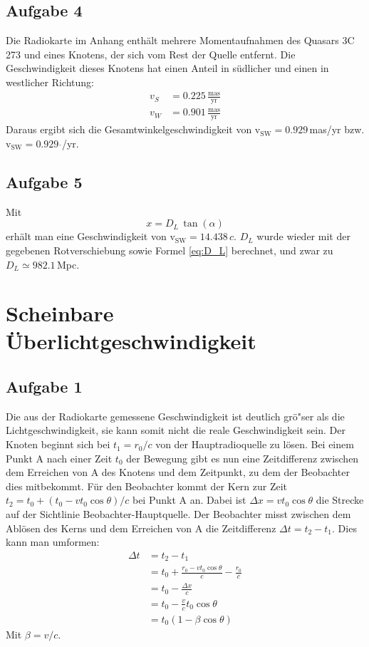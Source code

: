 \documentclass[12pt]{article}
\begin{document}
\subsection{Aufgabe 4}

Die Radiokarte im Anhang enth\"{a}lt mehrere Momentaufnahmen des Quasars 3C 273 und eines Knotens, der sich vom Rest der Quelle entfernt. Die Geschwindigkeit dieses Knotens hat einen Anteil in s\"{u}dlicher und einen in westlicher Richtung:
\begin{align*}
	v_S&=0.225\,\frac{\text{mas}}{\text{yr}}\\
	v_W&=0.901\,\frac{\text{mas}}{\text{yr}}
\end{align*}
Daraus ergibt sich die Gesamtwinkelgeschwindigkeit von v$_\text{SW}=0.929\,$mas/yr bzw. v$_\text{SW}=0.929$\,\,$\mathring{}$/yr. 

\subsection{Aufgabe 5}

Mit
\begin{equation*}
	x=D_L\,\tan(\alpha)
\end{equation*}
erh\"{a}lt man eine Geschwindigkeit von v$_\text{SW}=14.438\,c$. $D_L$ wurde wieder mit der gegebenen Rotverschiebung sowie Formel \ref{eq:D_L} berechnet, und zwar zu $D_L\simeq982.1$\,Mpc.


\section{Scheinbare \"{U}berlichtgeschwindigkeit}

\subsection{Aufgabe 1}

Die aus der Radiokarte gemessene Geschwindigkeit ist deutlich gr\"{o}"ser als die Lichtgeschwindigkeit, sie kann somit nicht die reale Geschwindigkeit sein. 
Der Knoten beginnt sich bei $t_1=r_0/c$ von der Hauptradioquelle zu l\"{o}sen. Bei einem Punkt A nach einer Zeit $t_0$ der Bewegung gibt es nun eine Zeitdifferenz zwischen dem Erreichen von A des Knotens und dem Zeitpunkt, zu dem der Beobachter dies mitbekommt. F\"{u}r den Beobachter kommt der Kern zur Zeit $t_2=t_0+(t_0-vt_0\cos \theta)/c$ bei Punkt A an. Dabei ist $\Delta x = vt_0\cos \theta$ die Strecke auf der Sichtlinie Beobachter-Hauptquelle. Der Beobachter misst zwischen dem Abl\"{o}sen des Kerns und dem Erreichen von A die Zeitdifferenz $\Delta t = t_2 - t_1$. Dies kann man umformen:
\begin{align*}
	\Delta t &= t_2 - t_1 \\
	         &= t_0+\frac{r_0-vt_0\cos \theta}{c} - \frac{r_0}{c} \\
	         &= t_0 - \frac{\Delta x}{c} \\
	         &= t_0 - \frac{v}{c} t_0 \cos \theta \\
	         &= t_0 (1-\beta \cos \theta)      
\end{align*}
Mit $\beta = v/c$.
\end{document}
